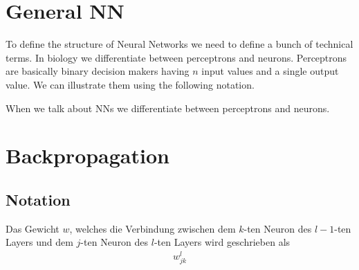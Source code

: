 \documentclass[10pt]{book}
\begin{document}
    \section{General NN}
    To define the structure of Neural Networks we need to define a bunch of
    technical terms. In biology we differentiate between perceptrons and neurons.
    Perceptrons are basically binary decision makers having \(n\) input values and a single output value.
    We can illustrate them using the following notation.
    \begin{center}
    \end{center}
    When we talk about NNs we differentiate between perceptrons and neurons.

    \section{Backpropagation}
    \subsection{Notation}

    Das Gewicht \(w\), welches die Verbindung zwischen dem \(k\)-ten Neuron des \(l-1\)-ten Layers und dem \(j\)-ten Neuron des \(l\)-ten Layers
    wird geschrieben als
    \begin{align}
        w_{jk}^l
    \end{align}
\end{document}
